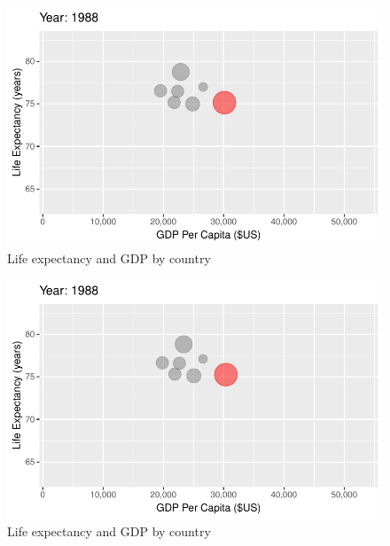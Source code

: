 \documentclass[
  letterpaper,
  DIV=11,
  numbers=noendperiod]{scrreport}
\theoremstyle{definition}
\theoremstyle{remark}
\begin{document}
\begin{figure}

{\centering \includegraphics{index_files/figure-pdf/fig-anim-country-65.pdf}

}

\caption{\label{fig-anim-country-65}Life expectancy and GDP by country}

\end{figure}

\begin{figure}

{\centering \includegraphics{index_files/figure-pdf/fig-anim-country-66.pdf}

}

\caption{\label{fig-anim-country-66}Life expectancy and GDP by country}

\end{figure}
\end{document}
